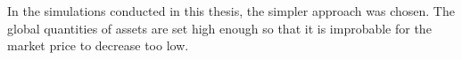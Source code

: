 In the simulations conducted in this thesis, the simpler approach was chosen. 
The global quantities of assets are set high enough so that it is improbable 
for the market price to decrease too low. 


